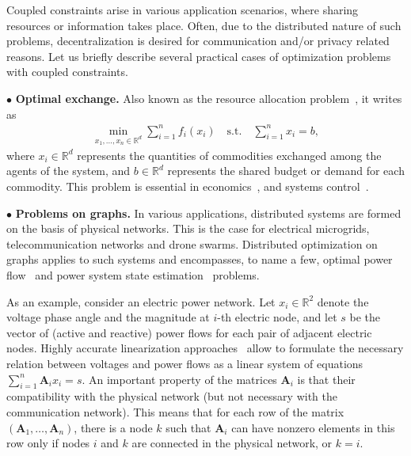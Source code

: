 \documentclass{article}
\newcommand{\qst}{\quad \text{s.t.} \quad}
\newcommand{\R}{\mathbb{R}}
\newcommand{\sX}{\R^d}
\newcommand{\mA}{\mathbf{A}}
\newcommand{\cbr}[1]{\left( #1 \right)}
\begin{document}
Coupled constraints arise in various application scenarios, where sharing resources or information takes place. 
Often, due to the distributed nature of such problems, decentralization is desired for communication and/or privacy related reasons.
Let us briefly describe several practical cases of optimization problems with coupled constraints.

$\bullet$ \textbf{Optimal exchange.} 
Also known as the resource allocation problem~\cite{boyd2011distributed,nedic2018improved}, it writes as
\begin{align*}
  \min_{x_1,\ldots,x_n \in \sX} \sum_{i=1}^n f_i(x_i) \qst \sum_{i=1}^n x_i = b,
\end{align*}
where $x_i \in \sX$ represents the quantities of commodities exchanged among the agents of the system,
and $b \in \sX$ represents the shared budget or demand for each commodity.
This problem is essential in economics~\cite{arrow1954existence}, and systems control~\cite{dominguez2012decentralized}.

$\bullet$  \textbf{Problems on graphs.} 
In various applications, distributed systems are formed on the basis of physical networks. %
This is the case for electrical microgrids, telecommunication networks and drone swarms. 
Distributed optimization on graphs applies to such systems and encompasses, to name a few, 
optimal power flow~\cite{wang2016fully} %
and power system state estimation~\cite{zhang2024geometric} %
problems.

As an example, consider an electric power network.
Let $x_i \in \R^2$ denote the voltage phase angle and the magnitude at $i$-th electric node,
and let $s$ be the vector of (active and reactive) power flows for each pair of adjacent electric nodes.
Highly accurate linearization approaches~\cite{yang2016state, van2014dc} allow to formulate the necessary 
relation between voltages and power flows as a linear system of equations $\sum_{i=1}^n \mA_i x_i = s$.
An important property of the matrices $\mA_i$ is that their compatibility with the physical network (but not necessary with the communication network).
This means that for each row of the matrix $\cbr{\mA_1, \ldots, \mA_n}$, there is a node $k$ such that $\mA_i$ can have nonzero elements in this row only if nodes $i$ and $k$ are connected in the physical network, or $k = i$.

\end{document}
